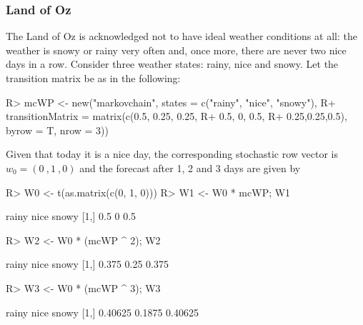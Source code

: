 \documentclass[
  nojss]{jss}
\begin{document}
\hypertarget{sec:wfLandOfOz}{%
\subsubsection{Land of Oz}\label{sec:wfLandOfOz}}

The Land of Oz is
acknowledged not to have ideal weather conditions at all:
the weather is snowy or rainy very often and, once more, there are never two
nice days in a row. Consider three weather states: rainy, nice and snowy. Let the transition matrix be as in the following:

\begin{CodeChunk}

\begin{CodeInput}
R> mcWP <- new("markovchain", states = c("rainy", "nice", "snowy"),
R+          transitionMatrix = matrix(c(0.5, 0.25, 0.25,
R+                                    0.5, 0, 0.5,
R+                                    0.25,0.25,0.5), byrow = T, nrow = 3))
\end{CodeInput}
\end{CodeChunk}

Given that today it is a nice day, the corresponding stochastic row vector is
\(w_{0}=(0\:,1\:,0)\) and the forecast after 1, 2 and 3 days are given by

\begin{CodeChunk}

\begin{CodeInput}
R> W0 <- t(as.matrix(c(0, 1, 0)))
R> W1 <- W0 * mcWP; W1
\end{CodeInput}

\begin{CodeOutput}
     rainy nice snowy
[1,]   0.5    0   0.5
\end{CodeOutput}

\begin{CodeInput}
R> W2 <- W0 * (mcWP ^ 2); W2
\end{CodeInput}

\begin{CodeOutput}
     rainy nice snowy
[1,] 0.375 0.25 0.375
\end{CodeOutput}

\begin{CodeInput}
R> W3 <- W0 * (mcWP ^ 3); W3
\end{CodeInput}

\begin{CodeOutput}
       rainy   nice   snowy
[1,] 0.40625 0.1875 0.40625
\end{CodeOutput}
\end{CodeChunk}
\end{document}
